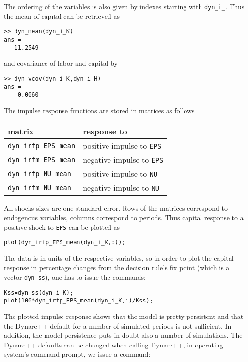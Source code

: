 \documentclass[10pt]{article}
\begin{document}
The ordering of the variables is also given by indexes starting with
{\tt dyn\_i\_}. Thus the mean of capital can be retrieved as

{\small
\begin{verbatim}
>> dyn_mean(dyn_i_K)
ans =
   11.2549
\end{verbatim}
}

\noindent and covariance of labor and capital by

{\small
\begin{verbatim}
>> dyn_vcov(dyn_i_K,dyn_i_H)
ans =
    0.0060
\end{verbatim}
}

The impulse response functions are stored in matrices as follows
\begin{center}
\begin{tabular}{|l|l|}
\hline
matrix& response to\\
\hline
{\tt dyn\_irfp\_EPS\_mean}& positive impulse to {\tt EPS}\\
{\tt dyn\_irfm\_EPS\_mean}& negative impulse to {\tt EPS}\\
{\tt dyn\_irfp\_NU\_mean}& positive impulse to {\tt NU}\\
{\tt dyn\_irfm\_NU\_mean}& negative impulse to {\tt NU}\\
\hline
\end{tabular}
\end{center}
All shocks sizes are one standard error. Rows of the matrices
correspond to endogenous variables, columns correspond to
periods. Thus capital response to a positive shock to {\tt EPS} can be
plotted as

{\small
\begin{verbatim}
plot(dyn_irfp_EPS_mean(dyn_i_K,:));
\end{verbatim}
}

The data is in units of the respective variables, so in order to plot
the capital response in percentage changes from the decision rule's
fix point (which is a vector {\tt dyn\_ss}), one has to issue the
commands:

{\small
\begin{verbatim}
Kss=dyn_ss(dyn_i_K);
plot(100*dyn_irfp_EPS_mean(dyn_i_K,:)/Kss);
\end{verbatim}
}

The plotted impulse response shows that the model is pretty persistent
and that the Dynare++ default for a number of simulated periods is not
sufficient. In addition, the model persistence puts in doubt also a
number of simulations. The Dynare++ defaults can be changed when
calling Dynare++, in operating system's command prompt, we issue a
command:
\end{document}
